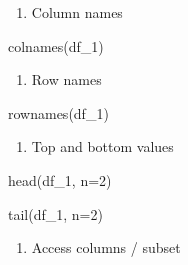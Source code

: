 \documentclass[
  letterpaper,
  DIV=11,
  numbers=noendperiod]{scrreprt}
\newenvironment{Shaded}{}{}
\newcommand{\AttributeTok}[1]{\textcolor[rgb]{0.84,0.23,0.29}{#1}}
\newcommand{\DecValTok}[1]{\textcolor[rgb]{0.00,0.36,0.77}{#1}}
\newcommand{\FunctionTok}[1]{\textcolor[rgb]{0.44,0.26,0.76}{#1}}
\newcommand{\NormalTok}[1]{\textcolor[rgb]{0.14,0.16,0.18}{#1}}
\newcommand{\SpecialCharTok}[1]{\textcolor[rgb]{0.00,0.36,0.77}{#1}}
\providecommand{\tightlist}{%
  \setlength{\itemsep}{0pt}\setlength{\parskip}{0pt}}\usepackage{longtable,booktabs,array}
\begin{document}
\begin{enumerate}
\def\labelenumi{\alph{enumi}.}
\setcounter{enumi}{4}
\tightlist
\item
  Column names
\end{enumerate}

\begin{Shaded}
\begin{Highlighting}[]
\FunctionTok{colnames}\NormalTok{(df\_1)}
\end{Highlighting}
\end{Shaded}

\begin{enumerate}
\def\labelenumi{\alph{enumi}.}
\setcounter{enumi}{5}
\tightlist
\item
  Row names
\end{enumerate}

\begin{Shaded}
\begin{Highlighting}[]
\FunctionTok{rownames}\NormalTok{(df\_1)}
\end{Highlighting}
\end{Shaded}

\begin{enumerate}
\def\labelenumi{\alph{enumi}.}
\setcounter{enumi}{6}
\tightlist
\item
  Top and bottom values
\end{enumerate}

\begin{Shaded}
\begin{Highlighting}[]
\FunctionTok{head}\NormalTok{(df\_1, }\AttributeTok{n=}\DecValTok{2}\NormalTok{)}
\end{Highlighting}
\end{Shaded}

\begin{Shaded}
\begin{Highlighting}[]
\FunctionTok{tail}\NormalTok{(df\_1, }\AttributeTok{n=}\DecValTok{2}\NormalTok{)}
\end{Highlighting}
\end{Shaded}

\begin{enumerate}
\def\labelenumi{\alph{enumi}.}
\setcounter{enumi}{7}
\tightlist
\item
  Access columns / subset
\end{enumerate}

\begin{Shaded}
\end{Shaded}
\end{document}
